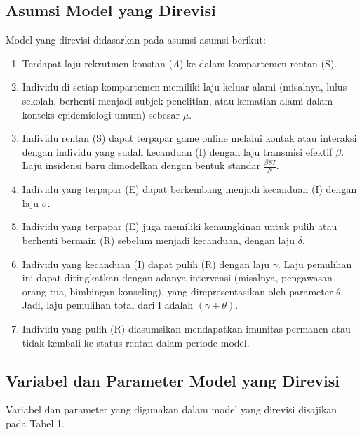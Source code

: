 \documentclass[12pt,a4paper]{article}
\begin{document}
\subsection{Asumsi Model yang Direvisi}
Model yang direvisi didasarkan pada asumsi-asumsi berikut:
\begin{enumerate}
    \item Terdapat laju rekrutmen konstan ($\Lambda$) ke dalam kompartemen rentan (S).
    \item Individu di setiap kompartemen memiliki laju keluar alami (misalnya, lulus sekolah, berhenti menjadi subjek penelitian, atau kematian alami dalam konteks epidemiologi umum) sebesar $\mu$.
    \item Individu rentan (S) dapat terpapar game online melalui kontak atau interaksi dengan individu yang sudah kecanduan (I) dengan laju transmisi efektif $\beta$. Laju insidensi baru dimodelkan dengan bentuk standar $\frac{\beta S I}{N}$.
    \item Individu yang terpapar (E) dapat berkembang menjadi kecanduan (I) dengan laju $\sigma$.
    \item Individu yang terpapar (E) juga memiliki kemungkinan untuk pulih atau berhenti bermain (R) sebelum menjadi kecanduan, dengan laju $\delta$.
    \item Individu yang kecanduan (I) dapat pulih (R) dengan laju $\gamma$. Laju pemulihan ini dapat ditingkatkan dengan adanya intervensi (misalnya, pengawasan orang tua, bimbingan konseling), yang direpresentasikan oleh parameter $\theta$. Jadi, laju pemulihan total dari I adalah $(\gamma + \theta)$.
    \item Individu yang pulih (R) diasumsikan mendapatkan imunitas permanen atau tidak kembali ke status rentan dalam periode model.
\end{enumerate}

\subsection{Variabel dan Parameter Model yang Direvisi}
Variabel dan parameter yang digunakan dalam model yang direvisi disajikan pada Tabel 1.
\end{document}
